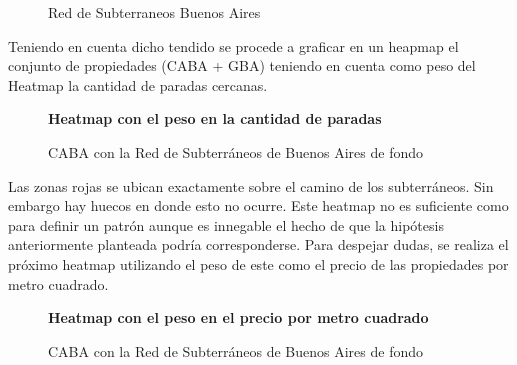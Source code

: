 \documentclass[a4paper, 10pt]{article}
\begin{document}
				\begin{figure}[H]
    				\centering
    				\caption{Red de Subterraneos Buenos Aires}
				\end{figure}
				
				
				Teniendo en cuenta dicho tendido se procede a graficar en un heapmap el conjunto de propiedades 
				(CABA + GBA) teniendo en cuenta como peso del Heatmap la cantidad de paradas cercanas.
			
				\begin{figure}[H]
    				\centering
    				\textbf{Heatmap con el peso en la cantidad de paradas}\par\medskip
    				\caption{CABA con la Red de Subterráneos de Buenos Aires de fondo}
				\end{figure}
				
				
				Las zonas rojas se ubican exactamente sobre el camino de 
				los subterráneos. Sin embargo hay huecos en donde esto no ocurre. 
				Este heatmap no es suficiente como para definir un patrón aunque 
				es innegable el hecho de que la hipótesis anteriormente planteada 
				podría corresponderse. Para despejar dudas, se realiza el próximo 
				heatmap utilizando el peso de este como el precio de las propiedades 
				por metro cuadrado.			
			
				\begin{figure}[H]
    				\centering
    				\textbf{Heatmap con el peso en el precio por metro cuadrado}\par\medskip
    				\caption{CABA con la Red de Subterráneos de Buenos Aires de fondo}
				\end{figure}
				
\end{document}
